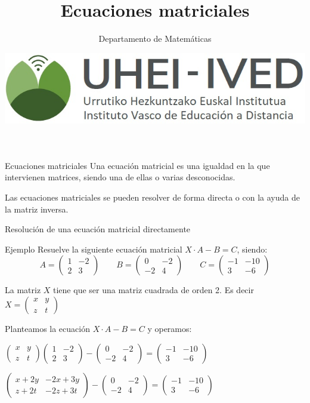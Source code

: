 \documentclass[9pt]{beamer}
\author{Departamento de Matemáticas}
\title{Ecuaciones matriciales}
\date{\includegraphics[scale=0.15]{imagenes/logoa.jpg}}
\begin{document}
\begin{frame}{Ecuaciones matriciales}
Una ecuación matricial es una igualdad en la que intervienen matrices, siendo una de ellas o varias desconocidas.

Las ecuaciones matriciales se pueden resolver de forma directa o con la ayuda de la matriz inversa.
\end{frame}


\begin{frame}{Resolución de una ecuación matricial directamente}
\begin{exampleblock}{Ejemplo}
Resuelve la siguiente ecuación matricial $X \cdot A -B=C$, siendo:
\[ A= \begin{pmatrix} 1 & -2 \\ 2 & 3 \end{pmatrix} \qquad B=\begin{pmatrix} 0 & -2 \\ -2 & 4 \end{pmatrix} \qquad C= \begin{pmatrix} -1 & -10 \\ 3 & -6 \end{pmatrix} \] 
\end{exampleblock}

\pause
La matriz $X$ tiene que ser una matriz cuadrada de orden 2. Es decir $X=\begin{pmatrix} x & y \\ z & t \end{pmatrix}$

\pause
Planteamos la ecuación $X\cdot A -B = C$ y operamos:

\pause
$\begin{pmatrix} x & y \\ z & t \end{pmatrix} \begin{pmatrix} 1 & -2 \\ 2 & 3 \end{pmatrix} - \begin{pmatrix} 0 & -2 \\ -2 & 4 \end{pmatrix} = \begin{pmatrix} -1 & -10 \\ 3 & -6 \end{pmatrix}$

\pause
$\begin{pmatrix} x+2y & -2x+3y \\ z+2t & -2z+3t \end{pmatrix}- \begin{pmatrix} 0 & -2 \\ -2 & 4 \end{pmatrix} = \begin{pmatrix} -1 & -10 \\ 3 & -6 \end{pmatrix}$


\end{frame}
\end{document}

